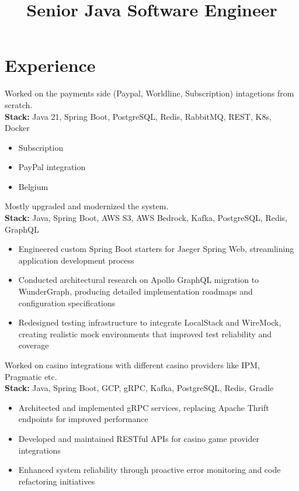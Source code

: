 \documentclass[11pt,a4paper,sans]{moderncv}
\title{Senior Java Software Engineer}
\begin{document}
    \makecvtitle

    \section{\textbf{Experience}}

    {
        Worked on the payments side (Paypal, Worldline, Subscription) intagetions from scratch.\\[0.2em]
    \small\textbf{Stack:} Java 21, Spring Boot, PostgreSQL, Redis, RabbitMQ, REST, K8s, Docker
    \vspace{5pt}
        \begin{itemize}[nosep, leftmargin=1.5em]
    \item Subscription
    \item PayPal integration
    \item Belgium
        \end{itemize}
    }

    {
        Mostly upgraded and modernized the system.\\[0.2em]
        \small\textbf{Stack:} Java, Spring Boot, AWS S3, AWS Bedrock, Kafka, PostgreSQL, Redis, GraphQL
    \vspace{5pt}
        \begin{itemize}[nosep, leftmargin=1.5em]
    \item Engineered custom Spring Boot starters for Jaeger Spring Web, streamlining application development process
    \item Conducted architectural research on Apollo GraphQL migration to WunderGraph, producing detailed implementation roadmaps and configuration specifications
    \item Redesigned testing infrastructure to integrate LocalStack and WireMock, creating realistic mock environments that improved test reliability and coverage
        \end{itemize}
    }

    {
        Worked on casino integrations with different casino providers like IPM, Pragmatic etc.\\[0.2em]
    \small\textbf{Stack:} Java, Spring Boot, GCP, gRPC, Kafka, PostgreSQL, Redis, Gradle
    \vspace{5pt}
        \begin{itemize}[nosep, leftmargin=1.5em]
    \item Architected and implemented gRPC services, replacing Apache Thrift endpoints for improved performance
    \item Developed and maintained RESTful APIs for casino game provider integrations
    \item Enhanced system reliability through proactive error monitoring and code refactoring initiatives
        \end{itemize}
    }
\end{document}
